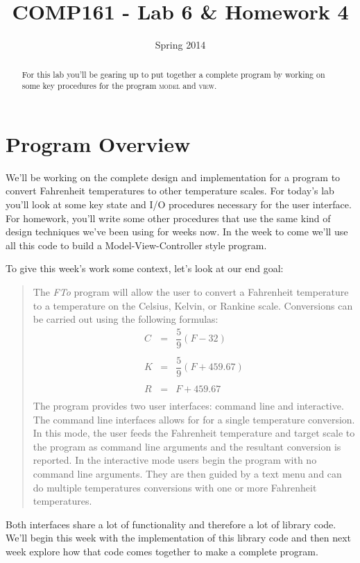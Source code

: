 \documentclass[]{tufte-handout}
\title{COMP161 - Lab 6 \& Homework 4}
\author{}
\date{Spring 2014}
\begin{document}
\maketitle

\begin{abstract}
For this lab you'll be gearing up to put together a complete program by working on some key procedures for the program \textsc{model} and \textsc{view}.
\end{abstract}

\section{Program Overview}

We'll be working on the complete design and implementation for a program to convert Fahrenheit temperatures to other temperature scales.  For today's lab you'll look at some key state and I/O procedures necessary for the user interface. For homework, you'll write some other procedures that use the same kind of design techniques we've been using for weeks now. In the week to come we'll use all this code to build a Model-View-Controller style program.

To give this week's work some context, let's look at our end goal:
\begin{framed}
\begin{quote}
The \textit{FTo} program will allow the user to convert a Fahrenheit temperature to a temperature on the Celsius, Kelvin, or Rankine scale. Conversions can be carried out using the following formulas:
\begin{equation*}
\begin{array}{rcl}
C &=& \dfrac{5}{9}(F-32)  \\ \\
K &=& \dfrac{5}{9}(F+459.67) \\ \\
R &=& F+459.67 \\
\end{array}
\end{equation*}
The program provides two user interfaces: command line and interactive.  The command line interfaces allows for for a single temperature conversion.  In this mode, the user feeds the Fahrenheit temperature and target scale to the program as command line arguments and the resultant conversion is reported.  In the interactive mode users begin the program with no command line arguments. They are then guided by a text menu and can do multiple temperatures conversions with one or more Fahrenheit temperatures. 
\end{quote}
\end{framed}
Both interfaces share a lot of functionality and therefore a lot of library code. We'll begin this week with the implementation of this library code and then next week explore how that code comes together to make a complete program. 
\end{document}
